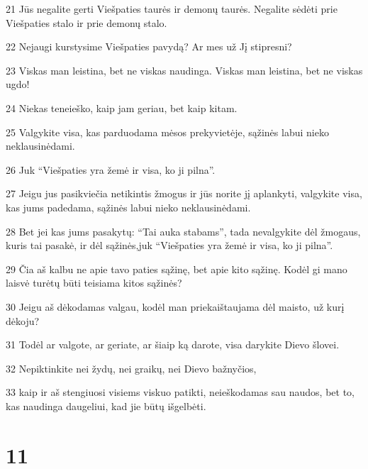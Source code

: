 \par 21 Jūs negalite gerti Viešpaties taurės ir demonų taurės. Negalite sėdėti prie Viešpaties stalo ir prie demonų stalo. 
\par 22 Nejaugi kurstysime Viešpaties pavydą? Ar mes už Jį stipresni? 
\par 23 Viskas man leistina, bet ne viskas naudinga. Viskas man leistina, bet ne viskas ugdo! 
\par 24 Niekas teneieško, kaip jam geriau, bet kaip kitam. 
\par 25 Valgykite visa, kas parduodama mėsos prekyvietėje, sąžinės labui nieko neklausinėdami. 
\par 26 Juk “Viešpaties yra žemė ir visa, ko ji pilna”. 
\par 27 Jeigu jus pasikviečia netikintis žmogus ir jūs norite jį aplankyti, valgykite visa, kas jums padedama, sąžinės labui nieko neklausinėdami. 
\par 28 Bet jei kas jums pasakytų: “Tai auka stabams”, tada nevalgykite dėl žmogaus, kuris tai pasakė, ir dėl sąžinės,­juk “Viešpaties yra žemė ir visa, ko ji pilna”. 
\par 29 Čia aš kalbu ne apie tavo paties sąžinę, bet apie kito sąžinę. Kodėl gi mano laisvė turėtų būti teisiama kitos sąžinės? 
\par 30 Jeigu aš dėkodamas valgau, kodėl man priekaištaujama dėl maisto, už kurį dėkoju? 
\par 31 Todėl ar valgote, ar geriate, ar šiaip ką darote, visa darykite Dievo šlovei. 
\par 32 Nepiktinkite nei žydų, nei graikų, nei Dievo bažnyčios, 
\par 33 kaip ir aš stengiuosi visiems viskuo patikti, neieškodamas sau naudos, bet to, kas naudinga daugeliui, kad jie būtų išgelbėti.


\chapter{11}

